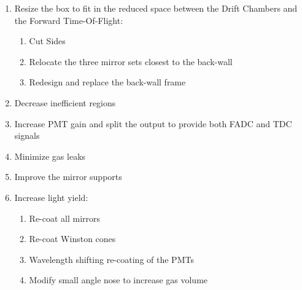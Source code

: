 \begin{enumerate}
\item Resize the box to fit in the reduced space between the Drift Chambers and the Forward Time-Of-Flight:
	\begin{enumerate}
		\item Cut Sides
		\item Relocate the three mirror sets closest to the back-wall
		\item Redesign and replace the back-wall frame
	\end{enumerate}

	\item Decrease inefficient regions
	\item Increase PMT gain and split the output to provide both FADC and TDC signals
	\item Minimize gas leaks
	\item Improve the mirror supports
	\item Increase light yield:
	\begin{enumerate}
		\item Re-coat all mirrors
		\item Re-coat Winston cones
		\item Wavelength shifting re-coating of the PMTs
		\item Modify small angle nose to increase gas volume
	\end{enumerate}
\end{enumerate}








